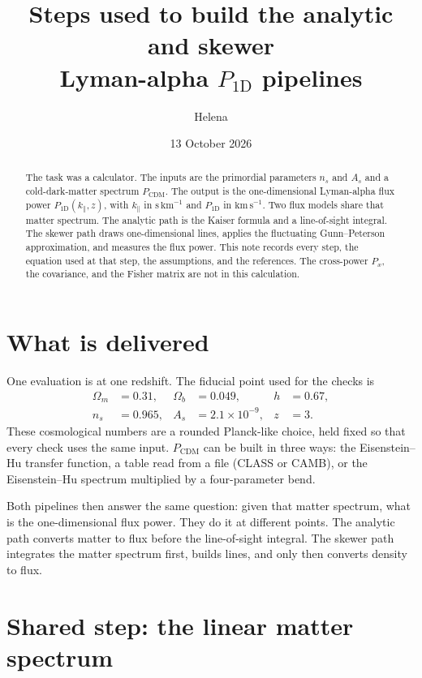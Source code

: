 \documentclass[11pt]{article}
\title{Steps used to build the analytic and skewer\\ Lyman-alpha $P_{1\mathrm{D}}$ pipelines}
\author{Helena}
\date{13 October 2026}
\begin{document}
\maketitle

\begin{abstract}
The task was a calculator. The inputs are the primordial parameters $n_s$ and $A_s$ and a cold-dark-matter spectrum $P_\mathrm{CDM}$. The output is the one-dimensional Lyman-alpha flux power $P_{1\mathrm{D}}(k_\parallel,z)$, with $k_\parallel$ in $\mathrm{s\,km}^{-1}$ and $P_{1\mathrm{D}}$ in $\mathrm{km\,s}^{-1}$. Two flux models share that matter spectrum. The analytic path is the Kaiser formula and a line-of-sight integral. The skewer path draws one-dimensional lines, applies the fluctuating Gunn--Peterson approximation, and measures the flux power. This note records every step, the equation used at that step, the assumptions, and the references. The cross-power $P_x$, the covariance, and the Fisher matrix are not in this calculation.
\end{abstract}

\section{What is delivered}
\label{sec:task}

One evaluation is at one redshift. The fiducial point used for the checks is
\begin{equation}
\begin{aligned}
\Omega_m &= 0.31, &
\Omega_b &= 0.049, &
h &= 0.67, \\
n_s &= 0.965, &
A_s &= 2.1\times 10^{-9}, &
z &= 3.
\end{aligned}
\end{equation}
These cosmological numbers are a rounded Planck-like choice, held fixed so that every check uses the same input. $P_\mathrm{CDM}$ can be built in three ways: the Eisenstein--Hu transfer function, a table read from a file (CLASS or CAMB), or the Eisenstein--Hu spectrum multiplied by a four-parameter bend.

Both pipelines then answer the same question: given that matter spectrum, what is the one-dimensional flux power. They do it at different points. The analytic path converts matter to flux before the line-of-sight integral. The skewer path integrates the matter spectrum first, builds lines, and only then converts density to flux.

\section{Shared step: the linear matter spectrum}
\label{sec:matter}
\end{document}
